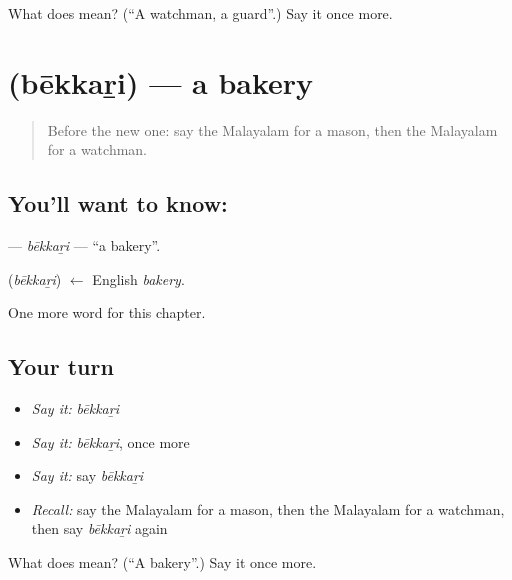 \begin{tcolorbox}[breakable,colback=teal!4,colframe=teal!35!black,title={Before you move on}]
What does  mean? (\textquotedblleft{}A watchman, a guard\textquotedblright{}.) Say it once more.
\end{tcolorbox}
\section[\texorpdfstring{\ml{ബേക്കറി} (bēkkaṟi)}{ബേക്കറി (bēkkaṟi)}]{ (bēkkaṟi) — a bakery}

\label{lesson:ML-C263-bekkari}



\begin{quote}
Before the new one: say the Malayalam for a mason, then the Malayalam for a watchman.
\end{quote}

\subsection*{You'll want to know: }
\textbf{} — \emph{bēkkaṟi} — \textquotedblleft{}a bakery\textquotedblright{}.

\begin{cousinweb}
\textbf{} (\emph{bēkkaṟi}) $\leftarrow$ English \emph{bakery}.
\end{cousinweb}

\begin{grammarlens}[title={What you've built}]
One more word for this chapter.
\end{grammarlens}

\subsection*{Your turn}
\begin{itemize}
\raggedright
  \item \emph{Say it:} \emph{bēkkaṟi}
  \item \emph{Say it:} \emph{bēkkaṟi}, once more
  \item \emph{Say it:} say \emph{bēkkaṟi}
  \item \emph{Recall:} say the Malayalam for a mason, then the Malayalam for a watchman, then say \emph{bēkkaṟi} again
\end{itemize}

\begin{tcolorbox}[breakable,colback=teal!4,colframe=teal!35!black,title={Before you move on}]
What does  mean? (\textquotedblleft{}A bakery\textquotedblright{}.) Say it once more.
\end{tcolorbox}
